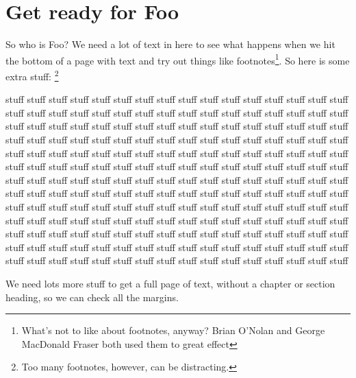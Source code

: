 \documentclass{bsu-ms}
\begin{document}
\label{ch:intro}

\section{Get ready for Foo}\label{sec:getReady}

So who is Foo? We need a lot of text in here to see what happens when
we hit the bottom of a page with text and try out things like
footnotes\footnote{What's not to like about footnotes, anyway?  Brian
  O'Nolan and George MacDonald Fraser both used them to great effect}.
So here is some extra stuff:%
\footnote{Too many footnotes, however, can be distracting.}

stuff stuff stuff stuff stuff stuff stuff stuff stuff stuff stuff stuff stuff
stuff stuff stuff stuff stuff stuff stuff stuff stuff stuff stuff stuff stuff
stuff stuff stuff stuff stuff stuff stuff stuff stuff stuff stuff stuff stuff
stuff stuff stuff stuff stuff stuff stuff stuff stuff stuff stuff stuff stuff
stuff stuff stuff stuff stuff stuff stuff stuff stuff stuff stuff stuff stuff
stuff stuff stuff stuff stuff stuff stuff stuff stuff stuff stuff stuff stuff
stuff stuff stuff stuff stuff stuff stuff stuff stuff stuff stuff stuff stuff
stuff stuff stuff stuff stuff stuff stuff stuff stuff stuff stuff stuff stuff
stuff stuff stuff stuff stuff stuff stuff stuff stuff stuff stuff stuff stuff
stuff stuff stuff stuff stuff stuff stuff stuff stuff stuff stuff stuff stuff
stuff stuff stuff stuff stuff stuff stuff stuff stuff stuff stuff stuff stuff
stuff stuff stuff stuff stuff stuff stuff stuff stuff stuff stuff stuff stuff
stuff stuff stuff stuff stuff stuff stuff stuff stuff stuff stuff stuff stuff
stuff stuff stuff stuff stuff stuff stuff stuff stuff stuff stuff stuff stuff
stuff stuff stuff stuff stuff stuff stuff stuff stuff stuff stuff stuff stuff
stuff stuff stuff stuff stuff stuff stuff stuff stuff stuff stuff stuff stuff

We need lots more stuff to get a full page of text, without a chapter
or section heading, so we can check all the margins.
\end{document}

